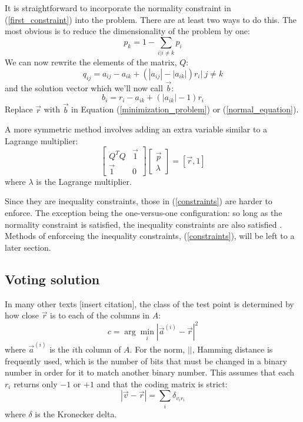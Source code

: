 \documentclass{article}
\begin{document}
It is straightforward to incorporate the normality constraint in (\ref{first_constraint}) into the problem. There are at least two ways to do this. The most
obvious is to reduce the dimensionality of the problem by one:
\begin{equation}
	p_k = 1 - \sum_{i|i \ne k} p_i
\end{equation}
We can now rewrite the elements of the matrix, $Q$:
\begin{equation}
	q_{ij} = a_{ij} - a_{ik} + (|a_{ij}|-|a_{ik}|)r_i | ~ j \ne k
\end{equation}
and the solution vector which we'll now call $\vec b$:
\begin{equation}
	b_i = r_i - a_{ik} + (|a_{ik}| - 1) r_i
\end{equation}
Replace $\vec r$ with $\vec b$ in Equation (\ref{minimization_problem}) or (\ref{normal_equation}).

A more symmetric method involves adding an extra variable similar to
a Lagrange multiplier:
\begin{equation}
	\begin{bmatrix}
		Q^T Q & \vec 1 \\
		\vec 1 & 0
	\end{bmatrix}
	\begin{bmatrix}
		\vec p\\
		\lambda
	\end{bmatrix}
	= [\vec r, 1]
\end{equation}
where $\lambda$ is the Lagrange multiplier.

Since they are inequality constraints, those in (\ref{constraints}) are
harder to enforce.
The exception being the one-versus-one configuration: so long as the normality
constraint is satisfied, the inequality constraints are also satisfied
\citep{Wu_etal2004}.
Methods of enforceing the inequality constraints, (\ref{constraints}), will
be left to a later section.

\subsection{Voting solution}

In many other texts [insert citation], the class of the test point is determined by how close $\vec r$
is to each of the columns in $A$:
\begin{equation}
	c = \arg \min_i |\vec a^{(i)} - \vec r|^2
\end{equation}
where $\vec a^{(i)}$ is the $i$th column of $A$. 
For the norm, $||$, Hamming distance is
frequently used, which is the number of bits that must be changed
in a binary number in order for it to match another binary number.
This assumes that each $r_i$ returns only $-1$ or $+1$ and that
the coding matrix is strict:
\begin{equation}
|\vec v - \vec r| = \sum_i \delta_{v_i r_i}
\end{equation}
where $\delta$ is the Kronecker delta. 
\end{document}
